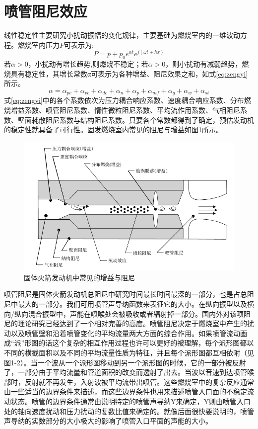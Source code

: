 \section{喷管阻尼效应}
线性稳定性主要研究小扰动振幅的变化规律，主要基础为燃烧室内的一维波动方程。燃烧室内压力$P$可表示为:
\begin{equation}
P=\dot{p}+p_0 e^{\alpha t} e^{j(\omega t+hx)}\label{eq:pressue p}
\end{equation}
若$\alpha>0$，小扰动有增长趋势,则燃烧不稳定；若$\alpha>0$，则小扰动有减弱趋势，燃烧具有稳定性，其增长常数α可表示为各种增益、阻尼效果之和，如式\ref{eq:zengyi}所示。
\begin{equation}
\alpha=\alpha_{pc}+\alpha_{vc}+\alpha_{dc}+\alpha_n+\alpha_p+\alpha_{mf}+\alpha_{g}+\alpha_{w}+\alpha_{st}\label{eq:zengyi}
\end{equation}
式\ref{eq:zengyi}中的各个系数依次为压力耦合响应系数、速度耦合响应系数、分布燃烧增益系数、喷管阻尼系数、惰性微粒阻尼系数、平均流作用系数、气相阻尼系数、壁面耗散阻尼系数与结构阻尼系数。只要各个常数都得到了确定，预估发动机的稳定性就具备了可行性。固发燃烧室内常见的阻尼与增益如图\ref{fig:zengyiyuzuni}所示。
\begin{figure}[htbp]
	\centering
	\includegraphics[width=0.7\linewidth]{figures/zengyiyuzuni}
	\caption{固体火箭发动机中常见的增益与阻尼}
	\label{fig:zengyiyuzuni}
\end{figure}
喷管阻尼是固体火箭发动机总阻尼中研究时间最长时间最深的一部分，也是占总阻尼中最大的一部分。我们可用喷管声导纳函数来表征它的大小。在纵向振型以及横向/纵向混合振型中，声能在喷喉处会被吸收或者辐射掉一部分。国内外对该项阻尼的理论研究已经达到了一个相对完善的高度。喷管阻尼决定于燃烧室中产生的扰动以及喷管壁和沿着喷管变化的平均流量两大方面的综合作用。如果喷管流动画成“派”形图的话这个复杂的相互作用过程也许可以更好的被理解，每个派形图都以不同的横截面积以及不同的平均流量性质为特征，并且每个派形图都互相依附（见图1-2）。当一个波从一个派形图移动到另一个派形图的时候，它的一部分被反射了，一部分由于平均流量和管道面积的改变而透射了出去。当波以音速到达喷管喉部时，反射就不再发生，入射波被平均流带出喷管。这些燃烧室中的复杂反应通常由一些适当的边界条件来描述，而这些边界条件也用来描述喷管入口面的不稳定流动状态。喷管的边界条件通常由说明特定的喷管声导纳Y来确定，Y则由喷管入口处的轴向速度扰动和压力扰动的复数比值来确定的。就像后面很快要说明的，喷管声导纳的实数部分的大小极大的影响了喷管入口平面的声能的大小。

